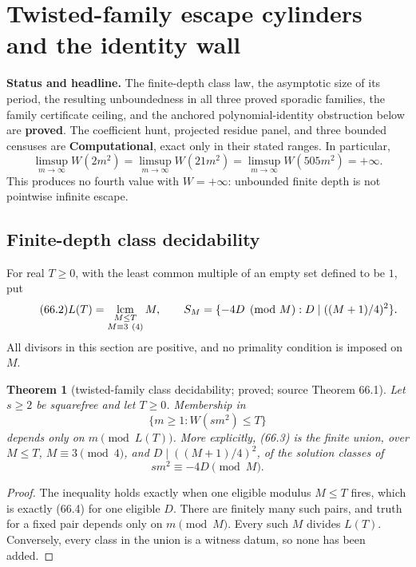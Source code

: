 \documentclass[10pt,reqno]{amsart}
\newtheorem{theorem}{Theorem}[section]
\theoremstyle{definition}
\newcommand{\1}{\mathbf 1}
\begin{document}
\section{Twisted-family escape cylinders and the identity wall}
\label{sec:escape-cylinders}
\medskip\noindent\textbf{Status and headline.}
The finite-depth class law, the asymptotic size of its period, the resulting
unboundedness in all three proved sporadic families, the family certificate
ceiling, and the anchored polynomial-identity obstruction below are
\textbf{proved}.  The coefficient hunt, projected residue panel, and three
bounded censuses are \textbf{Computational}, exact only in their stated
ranges.  In particular,
\begin{equation}\tag{66.1}
 \limsup_{m\to\infty}W(2m^2)=
 \limsup_{m\to\infty}W(21m^2)=
 \limsup_{m\to\infty}W(505m^2)=+\infty.
\end{equation}
This produces no fourth value with $W=+\infty$: unbounded finite depth is
not pointwise infinite escape.

\subsection{Finite-depth class decidability}
For real $T\geq0$, with the least common multiple of an empty set defined to
be $1$, put
\begin{equation}\tag{66.2}
 L(T)=\mathop{\rm lcm}_{\substack{M\leq T\\M\equiv3\ (4)}}M,
 \qquad
 S_M=\{-4D\pmod M:D\mid((M+1)/4)^2\}.
\end{equation}
All divisors in this section are positive, and no primality condition is
imposed on $M$.

\begin{theorem}[twisted-family class decidability; proved; source Theorem 66.1]
\label{thm:twisted-class-decidability}
Let $s\geq2$ be squarefree and let $T\geq0$.  Membership in
\begin{equation}\tag{66.3}
                         \{m\geq1:W(sm^2)\leq T\}
\end{equation}
depends only on $m\pmod {L(T)}$.  More explicitly, (66.3) is the finite
union, over $M\leq T$, $M\equiv3\pmod4$, and
$D\mid((M+1)/4)^2$, of the solution classes of
\begin{equation}\tag{66.4}
                              sm^2\equiv-4D\pmod M.
\end{equation}
\end{theorem}
\begin{proof}
The inequality holds exactly when one eligible modulus $M\leq T$ fires,
which is exactly (66.4) for one eligible $D$.  There are finitely many such
pairs, and truth for a fixed pair depends only on $m\pmod M$.  Every such
$M$ divides $L(T)$.  Conversely, every class in the union is a witness datum,
so none has been added.
\end{proof}
\end{document}
